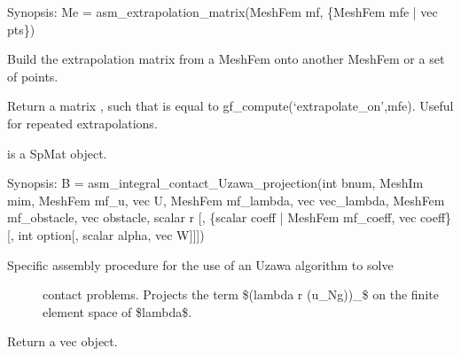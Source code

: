 \documentclass[a4paper,11pt,english]{sphinxmanual}
\begin{document}
\begin{fulllineitems}
\label{\detokenize{python/cmdref_Module asm:getfem.asm_extrapolation_matrix}}
Synopsis: Me = asm\_extrapolation\_matrix(MeshFem mf,  \{MeshFem mfe | vec pts\})

Build the extrapolation matrix from a MeshFem onto another MeshFem or a set of points.

Return a matrix , such that  is equal to
gf\_compute(‘extrapolate\_on’,mfe). Useful for repeated
extrapolations.

 is a SpMat object.

\end{fulllineitems}


\begin{fulllineitems}
\label{\detokenize{python/cmdref_Module asm:getfem.asm_integral_contact_Uzawa_projection}}
Synopsis: B = asm\_integral\_contact\_Uzawa\_projection(int bnum, MeshIm mim, MeshFem mf\_u, vec U, MeshFem mf\_lambda, vec vec\_lambda, MeshFem mf\_obstacle, vec obstacle, scalar r {[}, \{scalar coeff | MeshFem mf\_coeff, vec coeff\} {[}, int option{[}, scalar alpha, vec W{]}{]}{]})
\begin{description}
\item[{Specific assembly procedure for the use of an Uzawa algorithm to solve}] \leavevmode
contact problems. Projects the term \$\sphinxhyphen{}(lambda \sphinxhyphen{} r (u\_N\sphinxhyphen{}g))\_\sphinxhyphen{}\$ on the
finite element space of \$lambda\$.

\end{description}

Return a vec object.

\end{fulllineitems}
\end{document}
